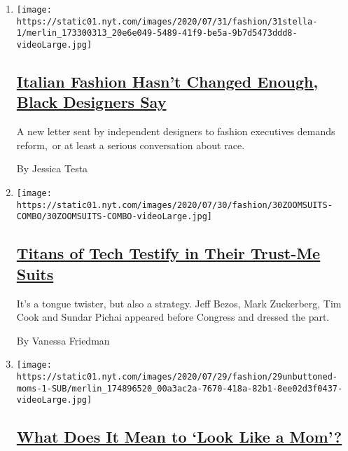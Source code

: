 \begin{enumerate}
\def\labelenumi{\arabic{enumi}.}
\item
  \texttt{[image: https://static01.nyt.com/images/2020/07/31/fashion/31stella-1/merlin\_173300313\_20e6e049-5489-41f9-be5a-9b7d5473ddd8-videoLarge.jpg]}

  \hypertarget{italian-fashion-hasnt-changed-enough-black-designers-say}{%
  \subsection{\texorpdfstring{\href{/2020/07/31/fashion/italian-fashion-black-designers.html}{Italian
  Fashion Hasn't Changed Enough, Black Designers
  Say}}{Italian Fashion Hasn't Changed Enough, Black Designers Say}}\label{italian-fashion-hasnt-changed-enough-black-designers-say}}

  A new letter sent by independent designers to fashion executives
  demands reform,~or at least a serious conversation about race.

  By Jessica Testa
\item
  \texttt{[image: https://static01.nyt.com/images/2020/07/30/fashion/30ZOOMSUITS-COMBO/30ZOOMSUITS-COMBO-videoLarge.jpg]}

  \hypertarget{titans-of-tech-testify-in-their-trust-me-suits}{%
  \subsection{\texorpdfstring{\href{/2020/07/29/style/Bezos-zuckerberg-cook-pichai-testimony-suits.html}{Titans
  of Tech Testify in Their Trust-Me
  Suits}}{Titans of Tech Testify in Their Trust-Me Suits}}\label{titans-of-tech-testify-in-their-trust-me-suits}}

  It's a tongue twister, but also a strategy. Jeff Bezos, Mark
  Zuckerberg, Tim Cook and Sundar Pichai appeared before Congress and
  dressed the part.

  By Vanessa Friedman
\item
  \texttt{[image: https://static01.nyt.com/images/2020/07/29/fashion/29unbuttoned-moms-1-SUB/merlin\_174896520\_00a3ac2a-7670-418a-82b1-8ee02d3f0437-videoLarge.jpg]}

  \hypertarget{what-does-it-mean-to-look-like-a-mom}{%
  \subsection{\texorpdfstring{\href{/2020/07/28/style/wall-of-moms-image.html}{What
  Does It Mean to `Look Like a
  Mom'?}}{What Does It Mean to `Look Like a Mom'?}}\label{what-does-it-mean-to-look-like-a-mom}}


\end{enumerate}
